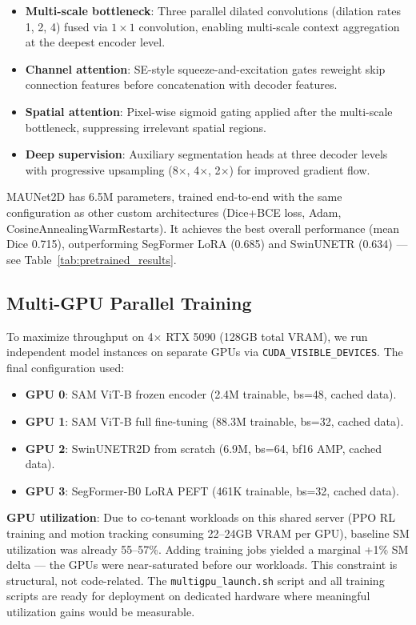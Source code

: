 \documentclass[11pt,a4paper]{article}
\begin{document}
\begin{itemize}
  \item \textbf{Multi-scale bottleneck}: Three parallel dilated convolutions (dilation rates 1, 2, 4) fused via $1\times1$ convolution, enabling multi-scale context aggregation at the deepest encoder level.
  \item \textbf{Channel attention}: SE-style squeeze-and-excitation gates reweight skip connection features before concatenation with decoder features.
  \item \textbf{Spatial attention}: Pixel-wise sigmoid gating applied after the multi-scale bottleneck, suppressing irrelevant spatial regions.
  \item \textbf{Deep supervision}: Auxiliary segmentation heads at three decoder levels with progressive upsampling (8$\times$, 4$\times$, 2$\times$) for improved gradient flow.
\end{itemize}

MAUNet2D has 6.5M parameters, trained end-to-end with the same configuration as other custom architectures (Dice+BCE loss, Adam, CosineAnnealingWarmRestarts). It achieves the best overall performance (mean Dice 0.715), outperforming SegFormer LoRA (0.685) and SwinUNETR (0.634) — see Table~\ref{tab:pretrained_results}.

\subsection{Multi-GPU Parallel Training}

To maximize throughput on 4$\times$ RTX 5090 (128GB total VRAM), we run independent model instances on separate GPUs via \texttt{CUDA\_VISIBLE\_DEVICES}. The final configuration used:

\begin{itemize}
  \item \textbf{GPU 0}: SAM ViT-B frozen encoder (2.4M trainable, bs=48, cached data).
  \item \textbf{GPU 1}: SAM ViT-B full fine-tuning (88.3M trainable, bs=32, cached data).
  \item \textbf{GPU 2}: SwinUNETR2D from scratch (6.9M, bs=64, bf16 AMP, cached data).
  \item \textbf{GPU 3}: SegFormer-B0 LoRA PEFT (461K trainable, bs=32, cached data).
\end{itemize}

\textbf{GPU utilization}: Due to co-tenant workloads on this shared server (PPO RL training and motion tracking consuming 22–24GB VRAM per GPU), baseline SM utilization was already 55–57\%. Adding training jobs yielded a marginal +1\% SM delta — the GPUs were near-saturated before our workloads. This constraint is structural, not code-related. The \texttt{multigpu\_launch.sh} script and all training scripts are ready for deployment on dedicated hardware where meaningful utilization gains would be measurable.
\end{document}
